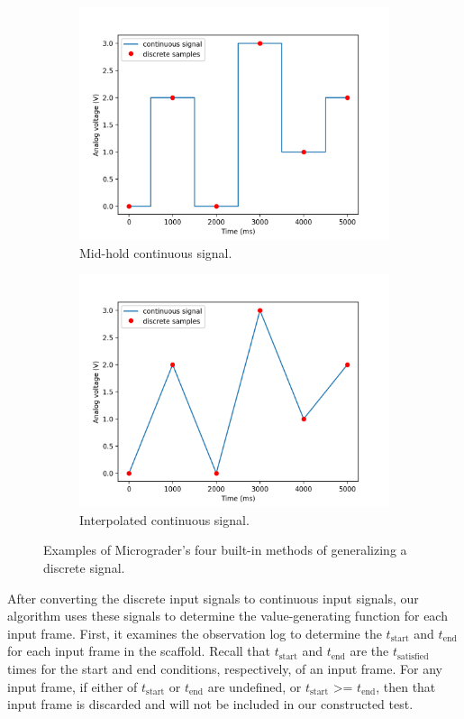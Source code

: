 \documentclass[12pt]{article}
\begin{document}
\begin{figure}
\begin{subfigure}[b]{.45\linewidth}
\includegraphics[width=\linewidth]{input-mid.png}
\caption{Mid-hold continuous signal.}
\end{subfigure}
\begin{subfigure}[b]{.45\linewidth}
\includegraphics[width=\linewidth]{input-inter.png}
\caption{Interpolated continuous signal.}
\end{subfigure}
\caption{Examples of Micrograder's four built-in methods of generalizing a discrete signal.}
\label{fig:interpolation}
\end{figure}

After converting the discrete input signals to continuous input signals, our algorithm uses these signals to determine the value-generating function for each input frame.  First, it examines the observation log to determine the $t_{\text{start}}$ and $t_{\text{end}}$ for each input frame in the scaffold.  Recall that $t_{\text{start}}$ and $t_{\text{end}}$ are the $t_{\text{satisfied}}$ times for the start and end conditions, respectively, of an input frame.  For any input frame, if either of $t_{\text{start}}$ or $t_{\text{end}}$ are undefined, or $t_{\text{start}}$ >= $t_{\text{end}}$, then that input  frame is discarded and will not be included in our constructed test.
\end{document}
